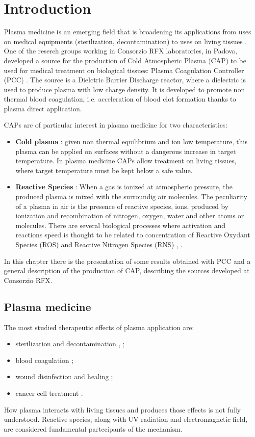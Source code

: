 \chapter{Introduction}
\label{ch:intro}
Plasma medicine is an emerging field that is broadening its applications from uses on medical equipments (sterilization, decontamination) to uses on living tissues \cite{plmed_review}. One of the reserch groups working in Consorzio RFX laboratories, in Padova, developed a source for the production of Cold Atmospheric Plasma (CAP) to be used for medical treatment on biological tissues: Plasma Coagulation Controller (PCC) \cite{DeMasi_2018}. The source is a Dielctric Barrier Discharge reactor, where a dielectric is used to produce plasma with low charge density. It is developed to promote non thermal blood coagulation, i.e. acceleration of blood clot formation thanks to plasma direct application.

CAPs are of particular interest in plasma medicine for two characteristics:
\begin{itemize}
 \item \textbf{Cold plasma} : given non thermal equilibrium and ion low temperature, this plasma can be applied on surfaces without a dangerous increase in target temperature. In plasma medicine CAPs allow treatment on living tissues, where target temperature must be kept below a safe value.
 \item \textbf{Reactive Species} : When a gas is ionized at atmospheric pressure, the produced plasma is mixed with the surroundig air molecules. The peculiarity of a plasma in air is the presence of reactive species, ions, produced by ionization and recombination of nitrogen, oxygen, water and other atoms or molecules. There are several biological processes where activation and reactions speed is thought to be related to concentration of Reactive Oxydant Species (ROS) and Reactive Nitrogen Species (RNS) \cite{doi:10.1152/ajplung.2000.279.6.L1005}, \cite{doi:10.1152/ajpcell.00366.2006}. 
\end{itemize}

In this chapter there is the presentation of some results obtained with PCC and a general description of the production of CAP, describing the sources developed at Consorzio RFX.

\section{Plasma medicine}
The most studied therapeutic effects of plasma application are:
\begin{itemize}
 \item sterilization and decontamination \cite{Martines_2009}, \cite{Stoffels_2007};
 \item blood coagulation \cite{Fridman2006};
 \item wound disinfection and healing \cite{Haertel2014};
 \item cancer cell treatment \cite{Yan2016}.
\end{itemize}
How plasma interacts with living tissues and produces those effects is not fully understood. Reactive species, along with UV radiation and electromagnetic field, are considered fundamental partecipants of the mechanism.

